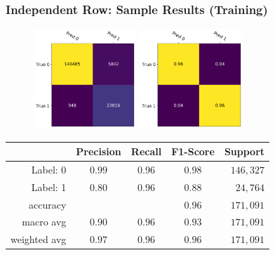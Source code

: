\documentclass[usenames,dvipsnames]{beamer}
\begin{document}
\begin{frame}
  \frametitle{Independent Row: Sample Results (Training)}
  \begin{figure}
    \centering
    \includegraphics[height=3.75cm, valign=c]{assets/ind_cm_train}
    \includegraphics[height=3.75cm, valign=c]{assets/ind_cm_norm_train}
  \end{figure}
  \begin{center}
    \begin{tabular}{rcccr}
    \toprule
    {} &  Precision &  Recall &  F1-Score & Support \\
    \midrule
    Label: 0 & $0.99$ & $0.96$ & $0.98$ & $146,327$ \\
    Label: 1 & $0.80$ & $0.96$ & $0.88$ & $24,764$ \\
    \midrule
    accuracy & {} & {} & $0.96$ & $171,091$ \\
    macro avg & $0.90$ & $0.96$ & $0.93$ & $171,091$ \\
    weighted avg & $0.97$ & $0.96$ & $0.96$ & $171,091$ \\
    \bottomrule
    \end{tabular}
  \end{center}
\end{frame}
\end{document}
